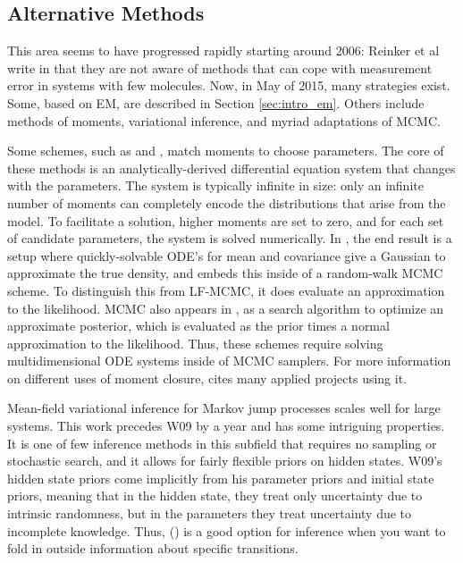 \documentclass{article}
\begin{document}
\subsection{Alternative Methods}
This area seems to have progressed rapidly starting around 2006: Reinker et al write in \cite{reinker2006parameter} that they are not aware of methods that can cope with measurement error in systems with few molecules. Now, in May of 2015, many strategies exist. Some, based on EM, are described in Section \ref{sec:intro_em}. Others include methods of moments, variational inference, and myriad adaptations of MCMC.

Some schemes, such as \cite{milner2013moment} and \cite{zechner2012moment}, match moments to choose parameters. The core of these methods is an analytically-derived differential equation system that changes with the parameters. The system is typically infinite in size: only an infinite number of moments can completely encode the distributions that arise from the model. To facilitate a solution, higher moments are set to zero, and for each set of candidate parameters, the system is solved numerically. In \cite{milner2013moment}, the end result is a setup where quickly-solvable ODE's for mean and covariance give a Gaussian to approximate the true density, and \cite{milner2013moment} embeds this inside of a random-walk MCMC scheme. To distinguish this from LF-MCMC, it does evaluate an approximation to the likelihood. MCMC also appears in  \cite{zechner2012moment}, as a search algorithm to optimize an approximate posterior, which is evaluated as the prior times a normal approximation to the likelihood. Thus, these schemes require solving multidimensional ODE systems inside of MCMC samplers. For more information on different uses of moment closure, \cite{Milner201199} cites many applied projects using it.

Mean-field variational inference for Markov jump processes \cite{opper2008variational}  scales well for large systems. This work precedes W09 by a year and has some intriguing properties. It is one of few inference methods in this subfield that requires no sampling or stochastic search, and it allows for fairly flexible priors on hidden states. W09's hidden state priors come implicitly from his parameter priors and initial state priors, meaning that in the hidden state, they treat only uncertainty due to intrinsic randomness, but in the parameters they treat uncertainty due to incomplete knowledge. Thus, (\cite{opper2008variational}) is a good option for inference when you want to fold in outside information about specific transitions.
\end{document}
